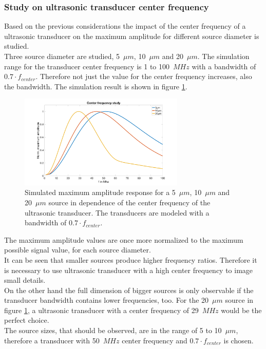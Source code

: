 \subsubsection{Study on ultrasonic transducer center frequency}

Based on the previous considerations the impact of the center frequency of a ultrasonic transducer on the maximum amplitude for different source diameter is studied.\\
Three source diameter are studied, 5~$\mu m$, 10~$\mu m$ and 20~$\mu m$. The simulation range for the transducer center frequency is 1 to 100~$MHz$ with a bandwidth of $0.7 \cdot f_{center}$. Therefore not just the value for the center frequency increases, also the bandwidth. The simulation result is shown in figure \ref{fig:centerFreq}.

\begin{figure}[H]
	\centering
	\includegraphics[width = 0.7\textwidth, height=0.3\textheight]{02_principles_of_photoacoustics/images/centerFreq.png}
	\caption{Simulated maximum amplitude response for a 5~$\mu m$, 10~$\mu m$ and 20~$\mu m$ source in dependence of the center frequency of the ultrasonic transducer. The transducers are modeled with a bandwidth of $0.7 \cdot f_{center}$.}
	\label{fig:centerFreq}
\end{figure}

The maximum amplitude values are once more normalized to the maximum possible signal value, for each source diameter.\\
It can be seen that smaller sources produce higher frequency ratios. Therefore it is necessary to use ultrasonic transducer with a high center frequency to image small details.\\
On the other hand the full dimension of bigger sources is only observable if the transducer bandwidth contains lower frequencies, too. For the  20~$\mu m$ source in figure \ref{fig:centerFreq}, a ultrasonic transducer with a center frequency of 29~$MHz$ would be the perfect choice.\\
The source sizes, that should be observed, are in the range of 5 to 10~$\mu m$, therefore a transducer with 50~$MHz$ center frequency and $0.7 \cdot f_{center}$ is chosen.  

